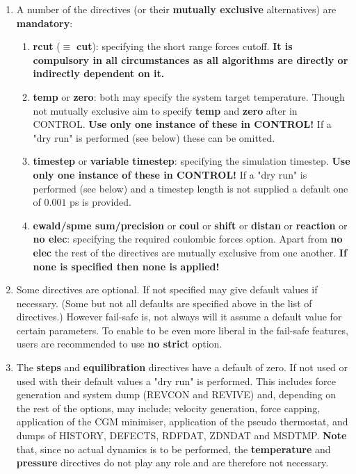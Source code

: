\begin{enumerate}
\item A number of the directives (or their {\bf mutually
exclusive} alternatives) are {\bf mandatory}:
\begin{enumerate}
\item {\bf rcut} ($\equiv$ {\bf cut}): specifying the short range forces cutoff.
{\bf It is compulsory in all circumstances as all \D algorithms are
directly or indirectly dependent on it.}
\item {\bf temp} or {\bf zero}: both may specify the system target temperature.
Though not mutually exclusive aim to specify {\bf temp} and {\bf zero} after
in CONTROL.  {\bf Use only one instance of these in CONTROL!}
If a "dry run" is performed (see below) these can be omitted.
\item {\bf timestep} or {\bf variable timestep}: specifying the
simulation timestep.  {\bf Use only one instance of these in
CONTROL!} If a "dry run" is performed (see below) and a timestep
length is not supplied a default one of $0.001$ ps is provided.
\item {\bf ewald/spme sum/precision} 
or {\bf coul} or {\bf shift} or {\bf distan} or {\bf reaction}
or {\bf no elec}: specifying the required coulombic forces
option.  Apart from {\bf no elec} the rest of the directives are
mutually exclusive from one another.  {\bf If none is specified
then none is applied!}
\end{enumerate}

\item Some directives are optional.  If not specified \D may give
default values if necessary.  (Some but not all defaults are specified
above in the list of directives.)  However fail-safe \D is, not always will
it assume a default value for certain parameters.  To enable \D to
be even more liberal in the fail-safe features, users are recommended
to use {\bf no strict} option.

\item The {\bf steps} and {\bf equilibration} directives have a
default of zero.  If not used or used with their default values a
"dry run" is performed.  This includes force generation and system
dump (REVCON and REVIVE) and, depending on the rest of the options,
may include; velocity generation, force capping, application of the
CGM minimiser, application of the pseudo thermostat, and dumps of
HISTORY, DEFECTS, RDFDAT, ZDNDAT and MSDTMP.  {\bf Note} that, since
no actual dynamics is to be performed, the {\bf temperature} and
{\bf pressure} directives do not play any role and are therefore
not necessary.


\end{enumerate}
